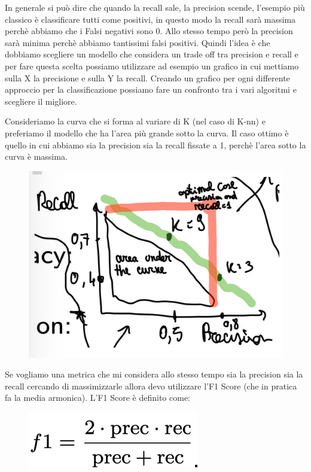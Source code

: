 \documentclass[14pt]{extreport}
\begin{document}
In generale si può dire che quando la recall sale, la precision scende, l’esempio più classico è classificare tutti come positivi, in questo modo la
recall sarà massima perchè abbiamo che i Falsi negativi sono 0. Allo stesso tempo però la precision sarà minima perchè abbiamo tantissimi falsi
positivi. Quindi l’idea è che dobbiamo scegliere un modello che considera un trade off tra precision e recall e per fare questa scelta possiamo
utilizzare ad esempio un grafico in cui mettiamo sulla X la precisione e sulla Y la recall. Creando un grafico per ogni differente approccio per la
classificazione possiamo fare un confronto tra i vari algoritmi e scegliere il migliore.

Consideriamo la curva che si forma al variare di K (nel caso di K-nn) e preferiamo il modello che ha l’area più grande sotto la curva. Il caso ottimo
è quello in cui  abbiamo sia la precision sia la recall fissate a 1, perchè l’area sotto la curva è massima.


\begin{figure}[H]
	\centering
	\includegraphics[width=0.7\linewidth]{460.jpeg}
\end{figure}

Se vogliamo una metrica che mi considera allo stesso tempo sia la precision sia la recall cercando di massimizzarle allora devo utilizzare l’F1 Score
(che in pratica fa la media armonica). L’F1 Score è definito come:


\begin{figure}[H]
	\centering
	\includegraphics[width=0.7\linewidth]{461.jpeg}
\end{figure}
\end{document}
